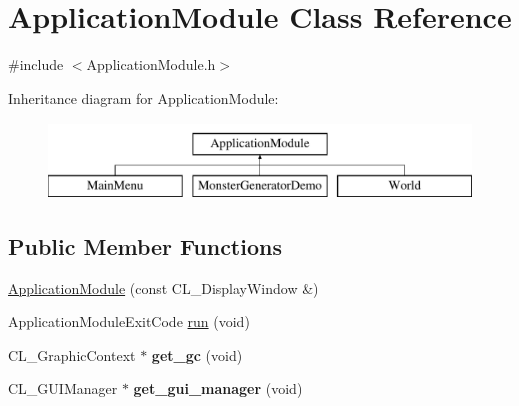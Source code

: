 \hypertarget{classApplicationModule}{
\section{ApplicationModule Class Reference}
\label{classApplicationModule}
}


{\ttfamily \#include $<$ApplicationModule.h$>$}

Inheritance diagram for ApplicationModule:\begin{figure}[H]
\begin{center}
\leavevmode
\includegraphics[height=2cm]{classApplicationModule}
\end{center}
\end{figure}
\subsection*{Public Member Functions}
\begin{DoxyCompactItemize}
\item 
\hyperlink{classApplicationModule_adee14a760314582348ee3205097fea4c}{ApplicationModule} (const CL\_\-DisplayWindow \&)
\item 
ApplicationModuleExitCode \hyperlink{classApplicationModule_a72494b92d2b093e0827893f527535a1f}{run} (void)
\item 
\hypertarget{classApplicationModule_a2c4555686e9bd25708a112ac852c3a17}{
CL\_\-GraphicContext $\ast$ {\bfseries get\_\-gc} (void)}
\label{classApplicationModule_a2c4555686e9bd25708a112ac852c3a17}

\item 
\hypertarget{classApplicationModule_a6c9168a94ebee4eacc23b7ce58878ce7}{
CL\_\-GUIManager $\ast$ {\bfseries get\_\-gui\_\-manager} (void)}
\label{classApplicationModule_a6c9168a94ebee4eacc23b7ce58878ce7}

\end{DoxyCompactItemize}
